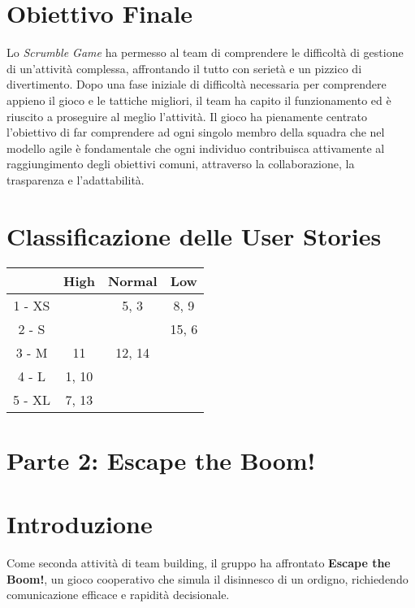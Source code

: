 \documentclass{article}
\begin{document}
\section*{Obiettivo Finale}
Lo \textit{Scrumble Game} ha permesso al team di comprendere le difficoltà di 
gestione di un'attività complessa, affrontando il tutto con serietà e un pizzico 
di divertimento. Dopo una fase iniziale di difficoltà necessaria per comprendere 
appieno il gioco e le tattiche migliori, il team ha capito il funzionamento ed è 
riuscito a proseguire al meglio l'attività. Il gioco ha pienamente centrato 
l'obiettivo di far comprendere ad ogni singolo membro della squadra che nel 
modello agile è fondamentale che ogni individuo contribuisca attivamente al 
raggiungimento degli obiettivi comuni, attraverso la collaborazione, la 
trasparenza e l'adattabilità.


\section*{Classificazione delle User Stories}

\begin{tabular}{|c|c|c|c|}
    \hline
    & { \color{red}High} & Normal & {\color{green}Low} \\
    \hline
    \cellcolor{darkgreen}1 - XS & & {5, 3} & {8, 9}\\
    \hline
    \cellcolor{lightgreen}2 - S & & & {15, 6} \\
    \hline
    \cellcolor{yellow}3 - M & {11} & {12, 14} & \\
    \hline
    \cellcolor{pink}4 - L & {1, 10} & & \\
    \hline
    \cellcolor{red}5 - XL & {7, 13} & & \\
    \hline
    \end{tabular}

\section*{Parte 2: Escape the Boom!}

\section*{Introduzione}
Come seconda attività di team building, il gruppo ha affrontato \textbf{Escape 
the Boom!}, un gioco cooperativo che simula il disinnesco di un ordigno, 
richiedendo comunicazione efficace e rapidità decisionale.
\end{document}
